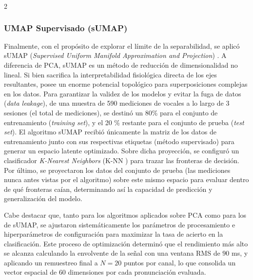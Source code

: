 \documentclass[11pt, letterpaper]{article}
\begin{document}
\begin{multicols*}{2}
\subsubsection*{UMAP Supervisado (sUMAP)}
  
Finalmente, con el propósito de explorar el límite de la separabilidad, se aplicó sUMAP (\textit{Supervised Uniform Manifold Approximation and Projection}) \cite{umap}. A diferencia de PCA, sUMAP es un método de reducción de dimensionalidad no lineal. Si bien sacrifica la interpretabilidad fisiológica directa de los ejes resultantes, posee un enorme potencial topológico para  superposiciones complejas en los datos. Para garantizar la validez de los modelos y evitar la fuga de datos (\textit{data leakage}), de una muestra de 590 mediciones de vocales a lo largo de 3 sesiones (el total de mediciones), se destinó un 80\% para el conjunto de entrenamiento (\textit{training set}), y el 20 \% restante para el conjunto de prueba (\textit{test set}). El algoritmo sUMAP recibió únicamente la matriz de los datos de entrenamiento junto con sus respectivas etiquetas (método supervisado) para generar un espacio latente optimizado. Sobre dicha proyección, se configuró un clasificador \textit{K-Nearest Neighbors} (K-NN \cite{hastie2009}) para trazar las fronteras de decisión. Por último, se proyectaron los datos del conjunto de prueba (las mediciones nunca antes vistas por el algoritmo) sobre este mismo espacio para evaluar dentro de qué fronteras caían, determinando así la capacidad de predicción y generalización del modelo.

Cabe destacar que, tanto para los algoritmos aplicados sobre PCA como para los de sUMAP, se ajustaron sistemáticamente los parámetros de procesamiento e hiperparámetros de configuración para maximizar la tasa de acierto en la clasificación. Este proceso de optimización determinó que el rendimiento más alto se alcanza calculando la envolvente de la señal con una ventana RMS de $90$ ms, y aplicando un remuestreo final a $N=20$ puntos por canal, lo que consolida un vector espacial de $60$ dimensiones por cada pronunciación evaluada.            


\end{multicols*}
\end{document}
